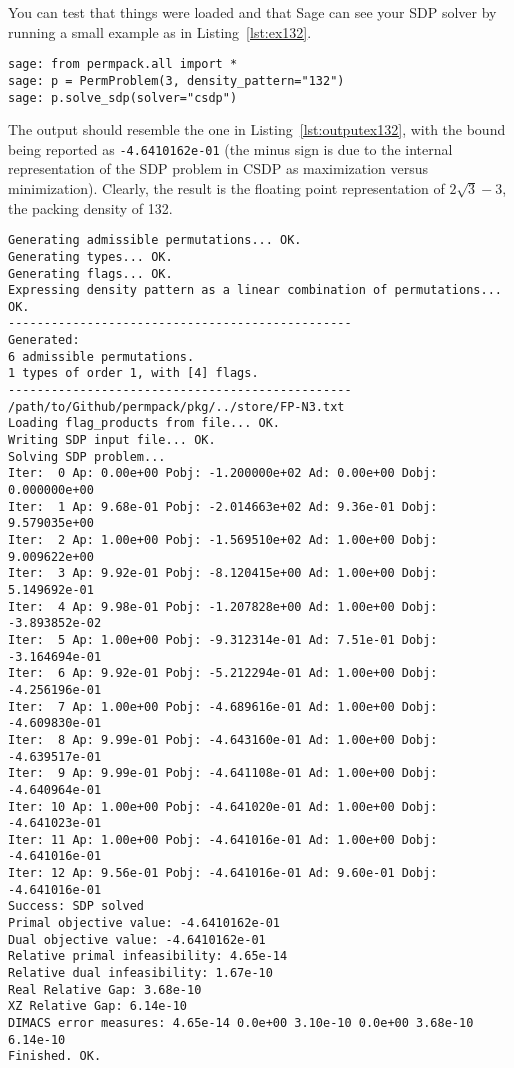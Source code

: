 You can test that things were loaded and that Sage can see your SDP solver by running a small example as in Listing~\ref{lst:ex132}.
 {}
\begin{lstlisting}
sage: from permpack.all import *
sage: p = PermProblem(3, density_pattern="132")
sage: p.solve_sdp(solver="csdp")
\end{lstlisting}
The output should resemble the one in Listing~\ref{lst:outputex132}, with the bound being reported as \texttt{-4.6410162e-01} (the minus sign is due to the internal representation of the SDP problem in CSDP as maximization versus minimization). Clearly, the result is the floating point representation of $2\sqrt{3}-3$, the packing density of 132. 
\begin{lstlisting}
Generating admissible permutations... OK.
Generating types... OK.
Generating flags... OK.
Expressing density pattern as a linear combination of permutations... OK.
------------------------------------------------
Generated:
6 admissible permutations.
1 types of order 1, with [4] flags.
------------------------------------------------
/path/to/Github/permpack/pkg/../store/FP-N3.txt
Loading flag_products from file... OK.
Writing SDP input file... OK.
Solving SDP problem...
Iter:  0 Ap: 0.00e+00 Pobj: -1.200000e+02 Ad: 0.00e+00 Dobj:  0.000000e+00 
Iter:  1 Ap: 9.68e-01 Pobj: -2.014663e+02 Ad: 9.36e-01 Dobj:  9.579035e+00 
Iter:  2 Ap: 1.00e+00 Pobj: -1.569510e+02 Ad: 1.00e+00 Dobj:  9.009622e+00 
Iter:  3 Ap: 9.92e-01 Pobj: -8.120415e+00 Ad: 1.00e+00 Dobj:  5.149692e-01 
Iter:  4 Ap: 9.98e-01 Pobj: -1.207828e+00 Ad: 1.00e+00 Dobj: -3.893852e-02 
Iter:  5 Ap: 1.00e+00 Pobj: -9.312314e-01 Ad: 7.51e-01 Dobj: -3.164694e-01 
Iter:  6 Ap: 9.92e-01 Pobj: -5.212294e-01 Ad: 1.00e+00 Dobj: -4.256196e-01 
Iter:  7 Ap: 1.00e+00 Pobj: -4.689616e-01 Ad: 1.00e+00 Dobj: -4.609830e-01 
Iter:  8 Ap: 9.99e-01 Pobj: -4.643160e-01 Ad: 1.00e+00 Dobj: -4.639517e-01 
Iter:  9 Ap: 9.99e-01 Pobj: -4.641108e-01 Ad: 1.00e+00 Dobj: -4.640964e-01 
Iter: 10 Ap: 1.00e+00 Pobj: -4.641020e-01 Ad: 1.00e+00 Dobj: -4.641023e-01 
Iter: 11 Ap: 1.00e+00 Pobj: -4.641016e-01 Ad: 1.00e+00 Dobj: -4.641016e-01 
Iter: 12 Ap: 9.56e-01 Pobj: -4.641016e-01 Ad: 9.60e-01 Dobj: -4.641016e-01 
Success: SDP solved
Primal objective value: -4.6410162e-01 
Dual objective value: -4.6410162e-01 
Relative primal infeasibility: 4.65e-14 
Relative dual infeasibility: 1.67e-10 
Real Relative Gap: 3.68e-10 
XZ Relative Gap: 6.14e-10 
DIMACS error measures: 4.65e-14 0.0e+00 3.10e-10 0.0e+00 3.68e-10 6.14e-10
Finished. OK.
\end{lstlisting}

